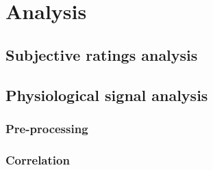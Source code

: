 \section{Analysis}

\subsection{Subjective ratings analysis}

\subsection{Physiological signal analysis}

\subsubsection{Pre-processing}

\subsubsection{Correlation}